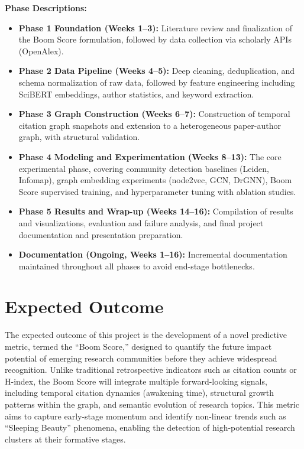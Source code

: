 \documentclass[a4paper,12pt]{article}
\begin{document}
\vspace{-35pt}
\noindent\textbf{Phase Descriptions:}
\vspace{-25pt}
\begin{itemize}
    \item \textbf{Phase 1 Foundation (Weeks 1--3):} Literature review and finalization 
    of the Boom Score formulation, followed by data collection via scholarly APIs 
    (OpenAlex).
    \vspace{-10pt}
    \item \textbf{Phase 2 Data Pipeline (Weeks 4--5):} Deep cleaning, deduplication, 
    and schema normalization of raw data, followed by feature engineering including 
    SciBERT embeddings, author statistics, and keyword extraction.
    \vspace{-10pt}
    \item \textbf{Phase 3 Graph Construction (Weeks 6--7):} Construction of temporal 
    citation graph snapshots and extension to a heterogeneous paper-author graph, 
    with structural validation.
    \vspace{-10pt}
    \item \textbf{Phase 4 Modeling and Experimentation (Weeks 8--13):} The core 
    experimental phase, covering community detection baselines (Leiden, Infomap), 
    graph embedding experiments (node2vec, GCN, DrGNN), Boom Score supervised training, 
    and hyperparameter tuning with ablation studies.
    \vspace{-10pt}
    \item \textbf{Phase 5 Results and Wrap-up (Weeks 14--16):} Compilation of results 
    and visualizations, evaluation and failure analysis, and final project documentation 
    and presentation preparation.
    \vspace{-10pt}
    \item \textbf{Documentation (Ongoing, Weeks 1--16):} Incremental documentation 
    maintained throughout all phases to avoid end-stage bottlenecks.
\end{itemize}

\newpage\section{Expected Outcome}
The expected outcome of this project is the development of a novel predictive metric, 
termed the “Boom Score,” designed to quantify the future impact potential of emerging 
research communities before they achieve widespread recognition. Unlike traditional 
retrospective indicators such as citation counts or H-index, the Boom Score will integrate 
multiple forward-looking signals, including temporal citation dynamics (awakening time), 
structural growth patterns within the graph, and semantic evolution of research topics. 
This metric aims to capture early-stage momentum and identify non-linear trends such as 
“Sleeping Beauty” phenomena, enabling the detection of high-potential research clusters 
at their formative stages.
\end{document}
